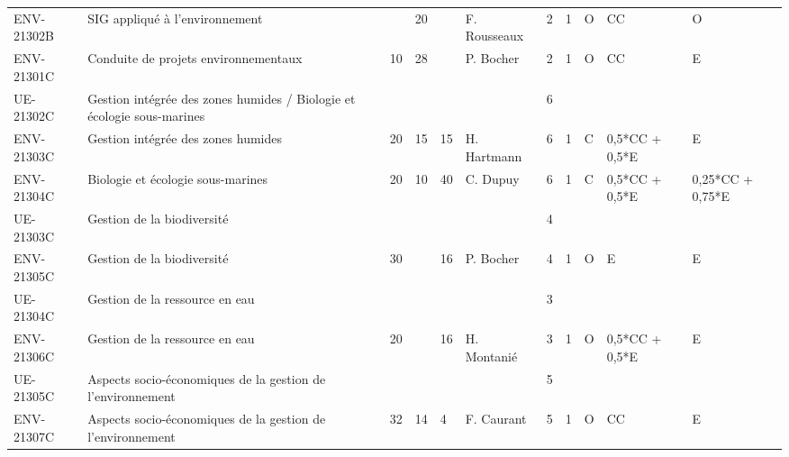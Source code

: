 \documentclass[a4paper,11pt]{article}
\begin{document}
{{\begin{tabular}{lllllllllll}
ENV-21302B    & SIG appliqué à l'environnement                                                 &    & 20 &    & F. Rousseaux    & 2    & 1    & O           & CC               & O                \\
ENV-21301C    & Conduite de projets environnementaux                                           & 10 & 28 &    & P. Bocher       & 2    & 1    & O           & CC               & E                \\
\rowcolor[HTML]{C0C0C0} 
UE-21302C     & Gestion intégrée des zones humides / Biologie et écologie sous-marines         &    &    &    &                 & 6    &      &             &                  &                  \\
ENV-21303C    & Gestion intégrée des zones humides                                             & 20 & 15 & 15 & H. Hartmann     & 6    & 1    & C           & 0,5*CC + 0,5*E   & E                \\
ENV-21304C    & Biologie et écologie sous-marines                                              & 20 & 10 & 40 & C. Dupuy        & 6    & 1    & C           & 0,5*CC + 0,5*E   & 0,25*CC + 0,75*E \\
\rowcolor[HTML]{C0C0C0} 
UE-21303C     & Gestion de la biodiversité                                                     &    &    &    &                 & 4    &      &             &                  &                  \\
ENV-21305C    & Gestion de la biodiversité                                                     & 30 &    & 16 & P. Bocher       & 4    & 1    & O           & E                & E                \\
\rowcolor[HTML]{C0C0C0} 
UE-21304C     & Gestion de la ressource en eau                                                 &    &    &    &                 & 3    &      &             &                  &                  \\
ENV-21306C    & Gestion de la ressource en eau                                                 & 20 &    & 16 & H. Montanié     & 3    & 1    & O           & 0,5*CC + 0,5*E   & E                \\
\rowcolor[HTML]{C0C0C0} 
UE-21305C     & Aspects socio-économiques de la gestion de l'environnement                     &    &    &    &                 & 5    &      &             &                  &                  \\
ENV-21307C    & Aspects socio-économiques de la gestion de l'environnement                     & 32 & 14 & 4  & F. Caurant      & 5    & 1    & O           & CC               & E                \\

\end{tabular}}}
\end{document}
